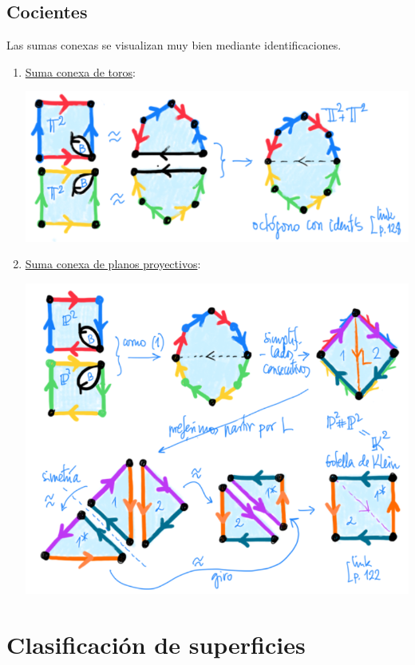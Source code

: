 \documentclass[10pt,a4paper,openright]{book}
\theoremstyle{break}
\begin{document}
\section{Cocientes}%
\label{sec:cocientes_sum_conx}
Las sumas conexas se visualizan muy bien mediante identificaciones.
\begin{enumerate}
    \item \underline{Suma conexa de toros}: 
    \begin{center}
        \includegraphics[scale=0.3]{images/sum_conx_toros} 
    \end{center}

    \item \underline{Suma conexa de planos proyectivos}:
    \begin{center}
        \includegraphics[scale=0.3]{images/sum_conx_planos_proy} 
    \end{center}
\end{enumerate}


\chapter{Clasificación de superficies}%
\label{cha:clasificacion_de_superficies}
\end{document}
